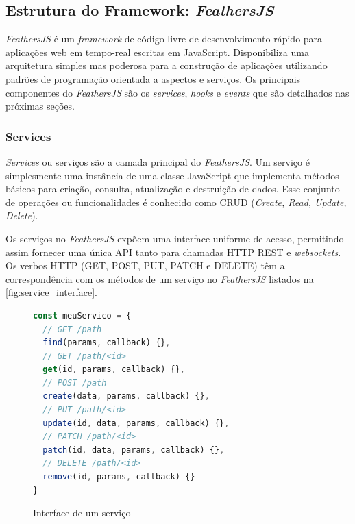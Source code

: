 \subsection{Estrutura do Framework: \textit{FeathersJS}}

\textit{FeathersJS} é um \textit{framework} de código livre de desenvolvimento rápido para aplicações
web em tempo-real escritas em JavaScript. Disponibiliza uma arquitetura simples mas poderosa
para a construção de aplicações utilizando padrões de programação orientada a aspectos e serviços.
Os principais componentes do \textit{FeathersJS} são os \textit{services}, \textit{hooks} e
\textit{events} que são detalhados nas próximas seções.

\subsubsection{Services}\label{subsection:feathers_services}
\textit{Services} ou serviços são a camada principal do \textit{\textit{FeathersJS}}.
Um serviço é simplesmente uma instância de uma classe JavaScript
que implementa métodos básicos para criação, consulta, atualização e
destruição de dados. Esse conjunto de operações ou funcionalidades é conhecido como
CRUD (\textit{Create, Read, Update, Delete}).

Os serviços no \textit{FeathersJS} expõem uma interface uniforme de acesso, permitindo
assim fornecer uma única API tanto para chamadas
HTTP REST e \textit{websockets}.
Os verbos HTTP (GET, POST, PUT, PATCH e DELETE) têm a correspondência com
os métodos de um serviço no \textit{\textit{FeathersJS}} listados na \autoref{fig:service_interface}.

\begin{figure}[h]
\caption{Interface de um serviço}
\label{fig:service_interface}
\begin{lstlisting}[language=JavaScript]
const meuServico = {
  // GET /path
  find(params, callback) {},
  // GET /path/<id>
  get(id, params, callback) {},
  // POST /path
  create(data, params, callback) {},
  // PUT /path/<id>
  update(id, data, params, callback) {},
  // PATCH /path/<id>
  patch(id, data, params, callback) {},
  // DELETE /path/<id>
  remove(id, params, callback) {}
}
\end{lstlisting}
\doautor
\end{figure}

